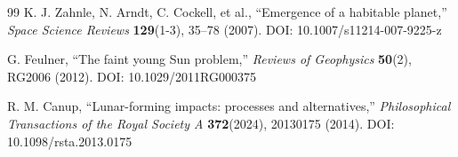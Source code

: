 \documentclass[11pt,a4paper]{article}
\begin{document}
\begin{thebibliography}{99}
		K. J. Zahnle, N. Arndt, C. Cockell, et al., ``Emergence of a habitable planet,''
		\emph{Space Science Reviews} \textbf{129}(1-3), 35–78 (2007).
		DOI: 10.1007/s11214-007-9225-z
		
		G. Feulner, ``The faint young Sun problem,''
		\emph{Reviews of Geophysics} \textbf{50}(2), RG2006 (2012).
		DOI: 10.1029/2011RG000375
		
		R. M. Canup, ``Lunar-forming impacts: processes and alternatives,''
		\emph{Philosophical Transactions of the Royal Society A} \textbf{372}(2024), 20130175 (2014).
		DOI: 10.1098/rsta.2013.0175
		
		\end{thebibliography}
		
	
\end{document}
